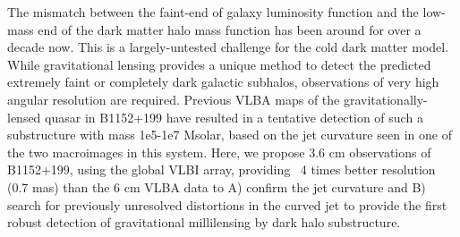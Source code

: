 \documentclass[a4paper, 11pt]{article}
\begin{document}
The mismatch between the faint-end of galaxy luminosity function and the low-mass end of the dark matter halo mass function has been around for over a decade now. This is a largely-untested challenge for the cold dark matter model. While gravitational lensing provides a unique method to detect the predicted extremely faint or completely dark galactic subhalos, observations of very high angular resolution are required. Previous VLBA maps of the gravitationally-lensed quasar in B1152+199 have resulted in a tentative detection of such a substructure with mass 1e5-1e7 Msolar, based on the jet curvature seen in one of the two macroimages in this system. Here, we propose 3.6 cm observations of B1152+199, using the global VLBI array, providing ~4 times better resolution (0.7 mas) than the 6 cm VLBA data to A) confirm the jet curvature and B) search for previously unresolved distortions in the curved jet to provide the first robust detection of gravitational millilensing by dark halo substructure.



\end{document}
